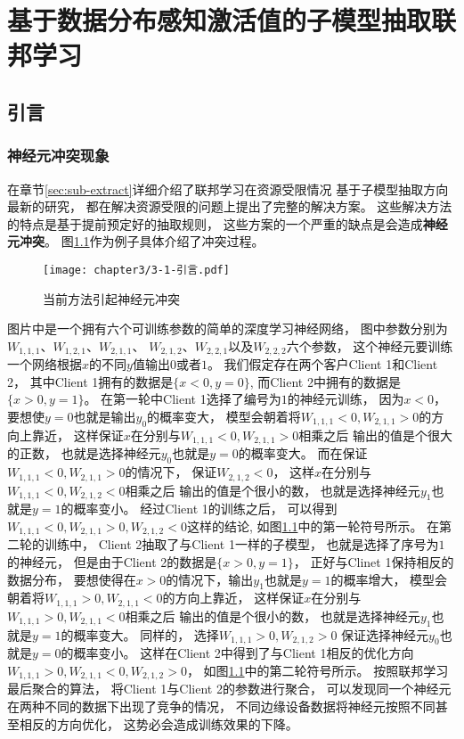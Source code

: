 \chapter{基于数据分布感知激活值的子模型抽取联邦学习}
\label{sec:chapterfeddse}
\section{引言}

\subsection{神经元冲突现象}
在章节\ref{sec:sub-extract}详细介绍了联邦学习在资源受限情况
基于子模型抽取方向最新的研究，
都在解决资源受限的问题上提出了完整的解决方案。
这些解决方法的特点是基于提前预定好的抽取规则，
这些方案的一个严重的缺点是会造成\textbf{神经元冲突}。
图\ref{fig:3-1competion}作为例子具体介绍了冲突过程。
\begin{figure}[thbp]
    \centering
    \texttt{[image: chapter3/3-1-引言.pdf]}
    \caption{\label{fig:3-1competion}当前方法引起神经元冲突}
\end{figure}
图片中是一个拥有六个可训练参数的简单的深度学习神经网络，
图中参数分别为$W_{1, 1, 1}$、$W_{1, 2, 1}$、$W_{2, 1, 1}$、
$W_{2, 1, 2}$、$W_{2, 2, 1}$以及$W_{2, 2, 2}$六个参数，
这个神经元要训练一个网络根据$x$的不同$y$值输出$0$或者$1$。
我们假定存在两个客户Client 1和Client 2，
其中Client 1拥有的数据是$\{ x < 0 , y=0 \}$,
而Client 2中拥有的数据是$\{ x > 0 , y=1 \}$。
在第一轮中Client 1选择了编号为$1$的神经元训练，
因为$x<0$，要想使$y=0$也就是输出$y_{0}$的概率变大，
模型会朝着将$W_{1, 1, 1}<0, W_{2, 1, 1}>0$的方向上靠近，
这样保证$x$在分别与$W_{1, 1, 1}<0, W_{2, 1, 1}>0$相乘之后
输出的值是个很大的正数，
也就是选择神经元$y_0$也就是$y=0$的概率变大。
而在保证$W_{1, 1, 1}<0, W_{2, 1, 1}>0$的情况下，
保证$W_{2, 1, 2}<0$，
这样$x$在分别与$W_{1, 1, 1}<0, W_{2, 1, 2}<0$相乘之后
输出的值是个很小的数，
也就是选择神经元$y_1$也就是$y=1$的概率变小。
经过Client 1的训练之后，
可以得到$W_{1, 1, 1}<0, W_{2, 1, 1}>0, W_{2, 1, 2}<0$这样的结论,
如图\ref{fig:3-1competion}中的第一轮符号所示。
在第二轮的训练中，
Client 2抽取了与Client 1一样的子模型，
也就是选择了序号为$1$的神经元，
但是由于Client 2的数据是$\{ x > 0 , y=1 \}$，
正好与Clinet 1保持相反的数据分布，
要想使得在$x>0$的情况下，输出$y_1$也就是$y=1$的概率增大，
模型会朝着将$W_{1, 1, 1}>0, W_{2, 1, 1}<0$的方向上靠近，
这样保证$x$在分别与$W_{1, 1, 1}>0, W_{2, 1, 1}<0$相乘之后
输出的值是个很小的数，
也就是选择神经元$y_1$也就是$y=1$的概率变大。
同样的，
选择$W_{1, 1, 1}>0, W_{2, 1, 2}>0$
保证选择神经元$y_0$也就是$y=0$的概率变小。
这样在Client 2中得到了与Client 1相反的优化方向
$W_{1, 1, 1}>0, W_{2, 1, 1}<0, W_{2, 1, 2}>0$，
如图\ref{fig:3-1competion}中的第二轮符号所示。
按照联邦学习最后聚合的算法，
将Client 1与Client 2的参数进行聚合，
可以发现同一个神经元在两种不同的数据下出现了竞争的情况，
不同边缘设备数据将神经元按照不同甚至相反的方向优化，
这势必会造成训练效果的下降。

